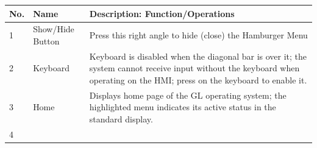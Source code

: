 \begin{longtable}[]{@{}lll@{}}
\toprule
\begin{minipage}[b]{0.05\columnwidth}\raggedright
No.\strut
\end{minipage} & \begin{minipage}[b]{0.30\columnwidth}\raggedright
Name\strut
\end{minipage} & \begin{minipage}[b]{0.56\columnwidth}\raggedright
Description: Function/Operations\strut
\end{minipage}\tabularnewline
\midrule
\endhead
\begin{minipage}[t]{0.05\columnwidth}\raggedright
1\strut
\end{minipage} & \begin{minipage}[t]{0.30\columnwidth}\raggedright
Show/Hide Button\strut
\end{minipage} & \begin{minipage}[t]{0.56\columnwidth}\raggedright
Press this right angle to hide (close) the Hamburger Menu\strut
\end{minipage}\tabularnewline
\begin{minipage}[t]{0.05\columnwidth}\raggedright
2\strut
\end{minipage} & \begin{minipage}[t]{0.30\columnwidth}\raggedright
Keyboard\strut
\end{minipage} & \begin{minipage}[t]{0.56\columnwidth}\raggedright
Keyboard is disabled when the diagonal bar is over it; the system cannot
receive input without the keyboard when operating on the HMI; press on
the keyboard to enable it.\strut
\end{minipage}\tabularnewline
\begin{minipage}[t]{0.05\columnwidth}\raggedright
3\strut
\end{minipage} & \begin{minipage}[t]{0.30\columnwidth}\raggedright
Home\strut
\end{minipage} & \begin{minipage}[t]{0.56\columnwidth}\raggedright
Displays home page of the GL operating system; the highlighted menu
indicates its active status in the standard display.\strut
\end{minipage}\tabularnewline
\begin{minipage}[t]{0.05\columnwidth}\raggedright
4\strut
\end{minipage} & \begin{minipage}[t]{0.30\columnwidth}\raggedright

\end{minipage}
\end{longtable}
